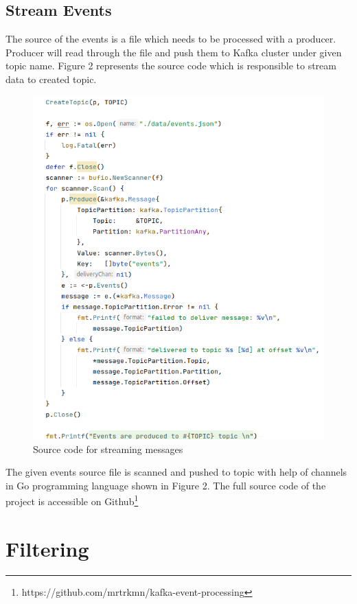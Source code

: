 \documentclass[sigplan,screen]{acmart}
\begin{document}
\subsection{Stream Events}
The source of the events is a file which needs to be processed with a producer. Producer will read through the file and push them to Kafka cluster under given topic name. Figure 2 represents the source code which is responsible to stream data to created topic. 
\begin{figure}[H]
    \centerline{\includegraphics[scale=.4]{assets/producer-code.png}}
    \caption{Source code for streaming messages}
    \label{fig}
\end{figure}
The given events source file is scanned and pushed to topic with help of channels in Go programming language shown in Figure 2. The full source code of the project is accessible on Github\footnote{https://github.com/mrtrkmn/kafka-event-processing}

\section{Filtering}
\end{document}
